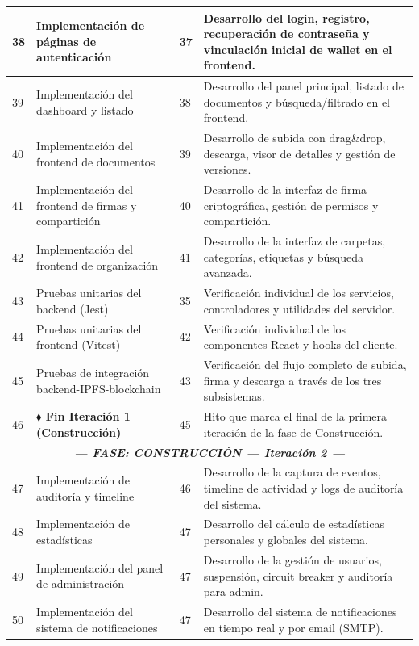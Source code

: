 \documentclass[11pt, a4paper]{article}
\begin{document}
\begin{longtable}{|p{1cm}|p{5.5cm}|p{1.5cm}|p{5.5cm}|}
\hline
38 & Implementación de páginas de autenticación & 37 & Desarrollo del login, registro, recuperación de contraseña y vinculación inicial de wallet en el frontend. \\
\hline
39 & Implementación del dashboard y listado & 38 & Desarrollo del panel principal, listado de documentos y búsqueda/filtrado en el frontend. \\
\hline
40 & Implementación del frontend de documentos & 39 & Desarrollo de subida con drag\&drop, descarga, visor de detalles y gestión de versiones. \\
\hline
41 & Implementación del frontend de firmas y compartición & 40 & Desarrollo de la interfaz de firma criptográfica, gestión de permisos y compartición. \\
\hline
42 & Implementación del frontend de organización & 41 & Desarrollo de la interfaz de carpetas, categorías, etiquetas y búsqueda avanzada. \\
\hline
43 & Pruebas unitarias del backend (Jest) & 35 & Verificación individual de los servicios, controladores y utilidades del servidor. \\
\hline
44 & Pruebas unitarias del frontend (Vitest) & 42 & Verificación individual de los componentes React y hooks del cliente. \\
\hline
45 & Pruebas de integración backend-IPFS-blockchain & 43 & Verificación del flujo completo de subida, firma y descarga a través de los tres subsistemas. \\
\hline
46 & \textbf{$\blacklozenge$ Fin Iteración 1 (Construcción)} & 45 & Hito que marca el final de la primera iteración de la fase de Construcción. \\
\hline
\multicolumn{4}{|c|}{\textit{\textbf{--- FASE: CONSTRUCCIÓN --- Iteración 2 ---}}} \\
\hline
47 & Implementación de auditoría y timeline & 46 & Desarrollo de la captura de eventos, timeline de actividad y logs de auditoría del sistema. \\
\hline
48 & Implementación de estadísticas & 47 & Desarrollo del cálculo de estadísticas personales y globales del sistema. \\
\hline
49 & Implementación del panel de administración & 47 & Desarrollo de la gestión de usuarios, suspensión, circuit breaker y auditoría para admin. \\
\hline
50 & Implementación del sistema de notificaciones & 47 & Desarrollo del sistema de notificaciones en tiempo real y por email (SMTP). \\

\end{longtable}
\end{document}
